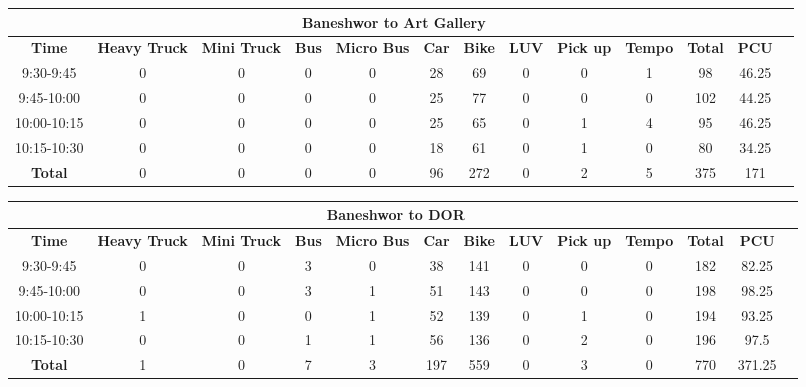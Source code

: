 \begin{landscape}
\centering
\begin{table}[h!]
\centering
\begin{tabular}{|c|c|c|c|c|c|c|c|c|c|c|c|c|}
    \hline
    \multicolumn{12}{|c|}{\textbf{Baneshwor to Art Gallery}} \\
    \hline
    \textbf{Time} & \textbf{Heavy Truck} & \textbf{Mini Truck} & \textbf{Bus} & \textbf{Micro Bus} & \textbf{Car} & \textbf{Bike} & \textbf{LUV} & \textbf{Pick up} & \textbf{Tempo} & \textbf{\textbf{Total}} & \textbf{PCU} \\
    \hline
    9:30-9:45	&0	&0	&0	&0	&28	&69	&0	&0	&1	&98	&46.25 \\ \hline
    9:45-10:00	&0	&0	&0	&0	&25	&77	&0	&0	&0	&102	&44.25 \\ \hline
    10:00-10:15	&0	&0	&0	&0	&25	&65	&0	&1	&4	&95	&46.25 \\ \hline
    10:15-10:30	&0	&0	&0	&0	&18	&61	&0	&1	&0	&80	&34.25 \\ \hline
    \textbf{Total}	    &0	&0	&0	&0	&96	&272	&0	&2	&5	&375	&171 \\ \hline


\end{tabular}

\vspace{0.5cm}

\begin{tabular}{|c|c|c|c|c|c|c|c|c|c|c|c|c|}
    \hline
    \multicolumn{12}{|c|}{\textbf{Baneshwor to DOR}} \\
    \hline
        \textbf{Time} & \textbf{Heavy Truck} & \textbf{Mini Truck} & \textbf{Bus} & \textbf{Micro Bus} & \textbf{Car} & \textbf{Bike} & \textbf{LUV} & \textbf{Pick up} & \textbf{Tempo} & \textbf{\textbf{Total}} & \textbf{PCU} \\
    \hline
9:30-9:45	&0	&0	&3	&0	&38	&141	&0	&0	&0	&182	&82.25 \\ \hline
9:45-10:00	&0	&0	&3	&1	&51	&143	&0	&0	&0	&198	&98.25 \\ \hline
10:00-10:15	&1	&0	&0	&1	&52	&139	&0	&1	&0	&194	&93.25 \\ \hline
10:15-10:30	&0	&0	&1	&1	&56	&136	&0	&2	&0	&196	&97.5 \\ \hline
\textbf{Total}	&1	&0	&7	&3	&197	&559	&0	&3	&0	&770	&371.25 \\ \hline


\end{tabular}

\vspace{0.5cm}


\end{table}
\end{landscape}
